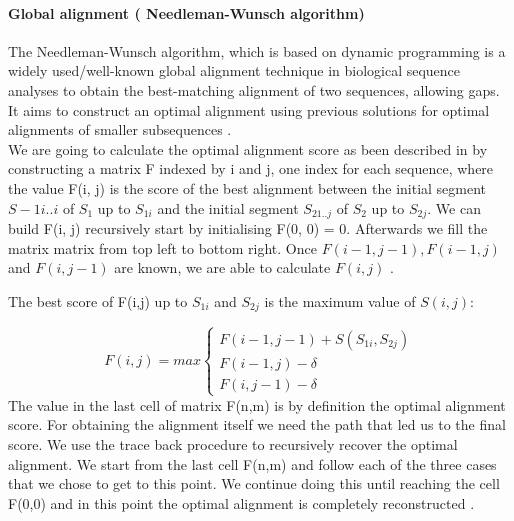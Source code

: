 \documentclass[11pt,a4paper]{report}
\begin{document}

\paragraph{ Global alignment ( Needleman-Wunsch algorithm) }

The Needleman-Wunsch algorithm, which is based on dynamic programming 
is a widely used/well-known global alignment technique in biological 
sequence analyses to obtain the best-matching alignment of two sequences, 
allowing  gaps.\\
It aims to construct an optimal alignment using previous solutions for
optimal alignments of smaller subsequences \cite{durbin}.\\
We are going to calculate the optimal alignment score as been described 
in\cite{durbin} by constructing a matrix F indexed
by i and j, one index for each sequence, where the value F(i, j) is the score
of the best alignment between the initial segment $S-{1i..i}$ of $S_{1}$ 
up to $S_{1i}$ and the initial segment $S_{21..j}$ of $S_{2}$  up to 
$S_{2j}$. We can build F(i, j) recursively start by initialising 
F(0, 0) = 0. Afterwards we fill the matrix matrix from top left to 
bottom right. 
Once $ F(i-1, j-1 ), F(i-1 , j) $ and $ F(i , j-1) $ are known, we 
are able to calculate $ F(i, j)$ \cite{durbin}.

The best score of F(i,j) up to $S_{1i}$ and $S_{2j}$ is the maximum 
value of $S(i,j)$:

\[ F(i,j)= max
\begin{cases}
   F(i-1,j-1) + S(S_{1i} , S_{2j})\\
   F(i-1 , j)- \delta\\
   F(i,j-1)- \delta
\end{cases}
\]
The value in the last cell of matrix F(n,m) is by definition the optimal 
alignment score. 
For obtaining the alignment itself we need the path that led us to the 
final score. We use the trace back procedure to recursively recover the 
optimal alignment\cite{durbin}\cite{eddydynamic}.
We start from the last cell F(n,m) and follow each of the three cases 
that we chose to get to this point. We continue doing this until reaching
the cell F(0,0) and in this point the optimal alignment is completely 
reconstructed \cite{eddydynamic}.




\end{document}
